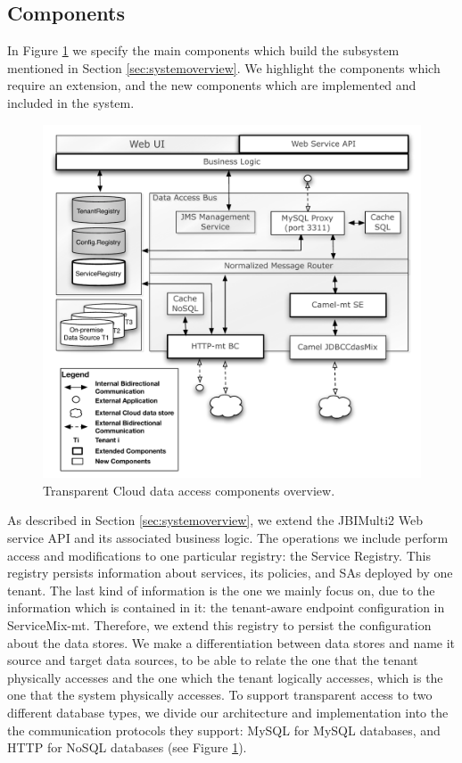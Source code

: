 \subsection{Components}
\label{subsec:components}

In Figure \ref{fig:componentoverview} we specify the main components which build the subsystem mentioned in Section \ref{sec:systemoverview}. We highlight the components which require an extension, and the new components which are implemented and included in the system. 

\begin{figure}[htb]
	\centering
		\includegraphics[clip, scale=0.6]{./gfx/componentoverview.pdf}
	\caption[Transparent Cloud Data Access Components Overview]{Transparent Cloud data access components overview.}
	\label{fig:componentoverview}
\end{figure}

As described in Section \ref{sec:systemoverview}, we extend the JBIMulti2 Web service \ac{API} and its associated business logic. The operations we include perform access and modifications to one particular registry: the Service Registry. This registry persists information about services, its policies, and \ac{SA}s deployed by one tenant. The last kind of information is the one we mainly focus on, due to the information which is contained in it: the tenant-aware endpoint configuration in ServiceMix-mt. Therefore, we extend this registry to persist the configuration about the data stores. We make a differentiation between data stores and name it source and target data sources, to be able to relate the one that the tenant physically accesses and the one which the tenant logically accesses, which is the one that the system physically accesses. To support transparent access to two different database types, we divide our architecture and implementation into the the communication protocols they support: MySQL for MySQL databases, and HTTP for \ac{NoSQL} databases (see Figure \ref{fig:componentoverview}). 

